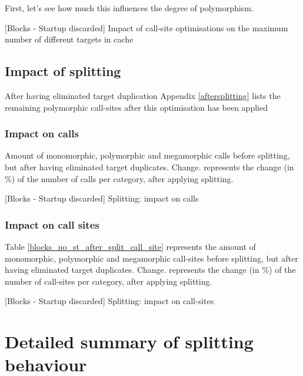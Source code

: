 \documentclass[preprint]{acmart}
\let\NoStartupBlocksBeforeAfterSplitCalls\BlocksBeforeAfterSplitCalls
\let\NoStartupBlocksBeforeAfterSplitSites\BlocksBeforeAfterSplitSites
\let\NoStartupBlocksExtent\BlocksExtent
\begin{document}
First, let's see how much this influences the degree of polymorphism.

\begin{table}[h!]
	\centering
	\NoStartupBlocksExtent
	\caption{[Blocks - Startup discarded] Impact of call-site optimisations on the maximum number of different targets in cache}
\end{table}


\subsection{Impact of splitting}
After having eliminated target duplication
Appendix \ref{aftersplitting} lists the remaining polymorphic call-sites after this optimisation has been applied

\subsubsection{\textbf{Impact on calls}}

Amount of monomorphic, polymorphic and megamorphic calls before splitting, but after having eliminated target duplicates.
Change. represents the change (in \%) of the number of calls per category, after applying splitting.

\begin{table}[h!]
	\centering	
	\NoStartupBlocksBeforeAfterSplitCalls
	\caption{[Blocks - Startup discarded] Splitting: impact on calls}
\end{table}

\subsubsection{\textbf{Impact on call sites}}

Table \ref{blocks_no_st_after_split_call_site} represents the amount of monomorphic, polymorphic and megamorphic call-sites before splitting, but after having eliminated target duplicates.
Change. represents the change (in \%) of the number of call-sites per category, after applying splitting.

\begin{table}[h!]
	\centering
	\NoStartupBlocksBeforeAfterSplitSites
	\caption{[Blocks - Startup discarded] Splitting: impact on call-sites}
	\label{blocks_no_st_after_split_call_site}
\end{table}

\section{Detailed summary of splitting behaviour}
\end{document}

